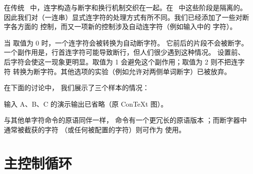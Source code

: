 
在传统 \TEX\ 中，连字构造与断字和换行机制交织在一起。在 \LUATEX\ 中这些阶段是隔离的。
因此我们对（一连串）显式连字符的处理方式有所不同。我们已经添加了一些对断字各方面的
控制，而又一项新的控制涉及自动连字符（例如输入中的 \type {-} 字符）。

当  取值为 0 时，一个连字符会被转换为自动断字符。
它前后的片段不会被断字。一个副作用是，行首连字符可能导致断行，但人们很少遇到这种情况。
设置前、后字符会使这一现象更明显。取值为 1 会避免这个副作用；取值为 2 则不把连字符
转换为断字符。其他选项的实验（例如允许对两侧单词断字）已被放弃。

\begin{typing}
\end{typing}

\begin{typing}
\end{typing}

\begin{typing}
\end{typing}

\begin{typing}
\end{typing}


在下面的讨论中，
我们展示了三个样本的情况：

输入 A、B、C 的演示输出已省略（原 ConTeXt 图）。

与其他单字符命令的原语同伴一样，\prm {-} 命令有一个更冗长的原语版本
；而断字器中通常被截获的字符 \type {-}
（或任何被配置的字符）则可作为  使用。

\section{主控制循环}

